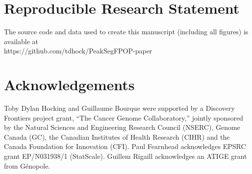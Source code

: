 \documentclass[aoas]{imsart}
\newcommand{\url}[1]{#1}
\begin{document}
\section{Reproducible Research Statement}

The source code and data used to create this manuscript (including all
figures) is available at\\
\url{https://github.com/tdhock/PeakSegFPOP-paper}


\section{Acknowledgements}
  
Toby Dylan Hocking and Guillaume Bourque were supported by a Discovery
Frontiers project grant, ``The Cancer Genome Collaboratory,'' jointly
sponsored by the Natural Sciences and Engineering Research Council
(NSERC), Genome Canada (GC), the Canadian Institutes of Health
Research (CIHR) and the Canada Foundation for Innovation (CFI). Paul
Fearnhead acknowledges EPSRC grant EP/N031938/1 (StatScale).
Guillem Rigaill acknowledges an ATIGE grant from G\'enopole.





 


\end{document}
